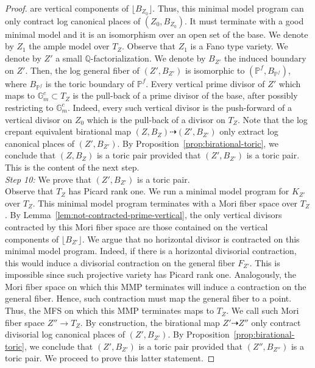 \documentclass{amsart}
\newcommand{\pp}{\mathbb{P}}
\renewcommand{\qq}{\mathbb{Q}}
\theoremstyle{remark}
\numberwithin{equation}{section}
\begin{document}
\begin{proof}
are vertical components of $\lfloor B_{Z_0}\rfloor$.
Thus, this minimal model program can only contract log canonical places of $(Z_0,B_{Z_0})$.
It must terminate with a good minimal model and it is an isomorphism over an open set of the base.
We denote by $Z_1$ the ample model over $T_Z$.
Observe that
$Z_1$ is a Fano type variety.
We denote by $Z'$ a small $\qq$-factorialization. 
We denote by $B_{Z'}$ the induced boundary on $Z'$.
Then, the log general fiber of $(Z',B_{Z'})$ is isomorphic to
$(\pp^f,B_{\pp^f})$,
where $B_{\pp^f}$ is the toric boundary of $\pp^f$.
Every vertical prime divisor of $Z'$ 
which maps to $\mathbb{G}_m^c\subset T_Z$
is the pull-back of a prime divisor of the base,
after possibly restricting to $\mathbb{G}_m^c$.
Indeed, every such vertical divisor
is the push-forward of a vertical divisor on $Z_0$
which is the pull-back of a divisor on $T_Z$.
Note that the log crepant equivalent  birational map
$(Z,B_Z)\dashrightarrow (Z',B_{Z'})$ only extract log canonical places of $(Z',B_{Z'})$.
By Proposition~\ref{prop:birational-toric}, we conclude that $(Z,B_Z)$ is a toric pair provided that $(Z',B_{Z'})$ is a toric pair.
This is the content of the next step.\\

\textit{Step 10:} We prove that $(Z',B_{Z'})$ is a toric pair.\\

Observe that $T_Z$ has Picard rank one.
We run a minimal model program for $K_{Z'}$ over $T_Z$.
This minimal model program terminates with a Mori fiber space over $T_Z$.
By Lemma~\ref{lem:not-contracted-prime-vertical}, the only vertical divisors contracted by this Mori fiber space are those contained on the vertical components
of $\lfloor B_{Z'}\rfloor$.
We argue that no horizontal divisor is contracted on this minimal model program.
Indeed, if there is a horizontal divisorial contraction, this would induce a divisorial contraction on the general fiber $F_{Z'}$.
This is impossible since such projective variety has Picard rank one.
Analogously, the Mori fiber space on which this MMP terminates
will induce a contraction on the general fiber.
Hence, such contraction must map the general fiber to a point.
Thus, the MFS on which this MMP terminates maps to $T_Z$.
We call such Mori fiber space $Z''\rightarrow T_Z$.
By construction, the birational map $Z'\dashrightarrow Z''$ 
only contract divisorial log canonical places of $(Z',B_{Z'})$.
By Proposition~\ref{prop:birational-toric}, we conclude that $(Z',B_{Z'})$
is a toric pair provided that $(Z'',B_{Z''})$ is a toric pair.
We proceed to prove this latter statement.


\end{proof}
\end{document}
